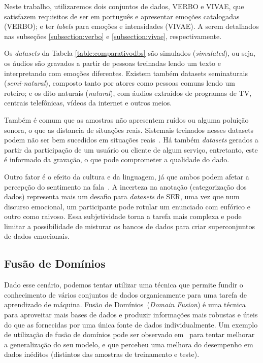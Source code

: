 Neste trabalho, utilizaremos dois conjuntos de dados, VERBO e VIVAE, que satisfazem requisitos de ser em português e apresentar emoções catalogadas (VERBO); e ter \textit{labels} para emoções e intensidades (VIVAE). A serem detalhados nas subseções \ref{subsection:verbo} e \ref{subsection:vivae}, respectivamente.

Os \textit{datasets} da Tabela \ref{table:comparativodbs} são simulados (\textit{simulated}), ou seja, os áudios são gravados a partir de pessoas treinadas lendo um texto e interpretando com emoções diferentes. Existem também datasets seminaturais (\textit{semi-natural}), composto tanto por atores como pessoas comuns lendo um roteiro; e os dito naturais (\textit{natural}), com áudios extraídos de programas de TV, centrais telefônicas, vídeos da internet e outros meios.

Também é comum que as amostras não apresentem ruídos ou alguma poluição sonora, o que as distancia de situações reais. Sistemais treinados nesses datasets podem não ser bem sucedidos em situações reais~\cite{32}. Há também \textit{datasets} gerados a partir da participação de um usuário ou cliente de algum serviço, entretanto, este é informado da gravação, o que pode comprometer a qualidade do dado.

Outro fator é o efeito da cultura e da linguagem, já que ambos podem afetar a percepção do sentimento na fala~\cite{32}. A incerteza na anotação (categorização dos dados) representa mais um desafio para \textit{datasets} de \acrshort{SER}, uma vez que num discurso emocional, um participante pode rotular um enunciado com eufórico e outro como raivoso. Essa subjetividade torna a tarefa mais complexa e pode limitar a possibilidade de misturar os bancos de dados para criar superconjuntos de dados emocionais.

\subsection{Fusão de Domínios}

Dado esse cenário, podemos tentar utilizar uma técnica que permite fundir o conhecimento de vários conjuntos de dados organicamente para uma tarefa de aprendizado de máquina. Fusão de Domínios~\cite{49}(\textit{Domain Fusion}) é uma técnica para aproveitar mais bases de dados e produzir informações mais robustas e úteis do que as fornecidas por uma única fonte de dados individualmente. Um exemplo de utilização de fusão de domínios pode ser observado em~\cite{3} para tentar melhorar a generalização do seu modelo, e que percebeu uma melhora do desempenho em dados inéditos (distintos das amostras de treinamento e teste).

